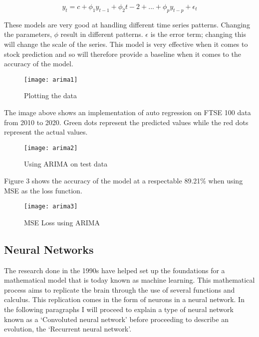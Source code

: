 \documentclass{article}
\begin{document}
\begin{equation}
    y_t = c + \phi_1 y_{t-1} + \phi_2 {t-2} + ... + \phi_p y_{t-p} + \epsilon_t
\end{equation}

These models are very good at handling different time series patterns. Changing the parameters, $\phi$ result in different patterns. $\epsilon$ is the error term; changing this will change the scale of the series. This model is very effective when it comes to stock prediction and so will therefore provide a baseline when it comes to the accuracy of the model.
\begin{figure}[h]
    \centering
    \texttt{[image: arima1]}
    \caption{Plotting the data }
\end{figure}
The image above shows an implementation of auto regression on FTSE 100 data from 2010 to 2020. Green dots represent the predicted values while the red dots represent the actual values.
\clearpage
\begin{figure}[h]
    \centering
    \texttt{[image: arima2]}
    \caption{Using ARIMA on test data }
\end{figure}
Figure 3 shows the accuracy of the model at a respectable 89.21\% when using MSE as the loss function.
\begin{figure}[h]
    \centering
    \texttt{[image: arima3]}
    \caption{MSE Loss using ARIMA }
\end{figure}

\subsection{Neural Networks}
The research done in the 1990s have helped set up the foundations for a mathematical model that is today known as machine learning. This mathematical process aims to replicate the brain through the use of several functions and calculus. This replication comes in the form of neurons in a neural network. In the following paragraphs I will proceed to explain a type of neural network known as a ‘Convoluted neural network’ before proceeding to describe an evolution, the ‘Recurrent neural network’.
\end{document}

